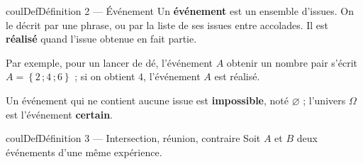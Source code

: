 \documentclass[11pt,a4paper]{article}
\makeatletter
\newcommand{\lycee@ens}[1]{\left\{#1\right\}}
\providecommand{\ens}{\lycee@ens}}
\newcounter{lycee@signet}
\newcommand{\signet}[3][]{\stepcounter{lycee@signet}%
  \edef\lycee@dest{\if\relax\detokenize{#1}\relax
    signet.\arabic{lycee@signet}\else#1\fi}%
  \hypertarget{\lycee@dest}{}\bookmark[level=#2,dest=\lycee@dest]{#3}}
\newenvironment{definitionbox}[1][Définition]%
  {\begin{boitecours}[phantom={\signet{2}{#1}}]{coulDef}{#1}}{\end{boitecours}}
\makeatother
\begin{document}
\begin{definitionbox}[Définition 2 --- Événement]
Un \textbf{événement} est un ensemble d'issues. On le décrit par une phrase, ou par la
liste de ses issues entre accolades. Il est \textbf{réalisé} quand l'issue obtenue en
fait partie.

\smallskip
Par exemple, pour un lancer de dé, l'événement $A$ \og obtenir un nombre pair\fg{} s'écrit
$A=\ens{2\,;4\,;6}$ ; si on obtient $4$, l'événement $A$ est réalisé.

\smallskip
Un événement qui ne contient aucune issue est \textbf{impossible}, noté $\varnothing$ ;
l'univers $\Omega$ est l'événement \textbf{certain}.
\end{definitionbox}

\begin{definitionbox}[Définition 3 --- Intersection, réunion, contraire]
Soit $A$ et $B$ deux événements d'une même expérience.


\end{definitionbox}
\end{document}
